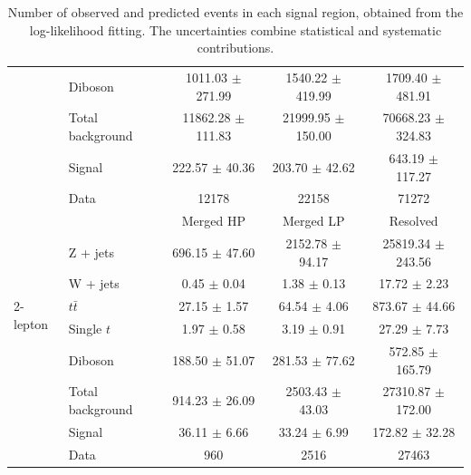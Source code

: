 \begin{table}[htbp]
\begin{center}
\begin{tabular}{| l | l | c | c | c |}
                   & Diboson      &  1011.03 $\pm$ 271.99          &   1540.22 $\pm$ 419.99         & 1709.40 $\pm$ 481.91\\ \cline{2-5}
                   & Total background    & 11862.28 $\pm$ 111.83            &   21999.95 $\pm$ 150.00         & 70668.23 $\pm$ 324.83\\ \cline{2-5}
                   & Signal       & 222.57 $\pm$ 40.36           & 203.70 $\pm$ 42.62           &643.19 $\pm$ 117.27\\ \cline{2-5}
                   & Data         & 12178           & 22158           &71272\\ \hline \hline
\multirow{7}{*}{2-lepton} &     & Merged HP  & Merged LP               & Resolved  \\ \cline{2-5}
        & Z + jets    &  696.15 $\pm$ 47.60  & 2152.78 $\pm$ 94.17     & 25819.34 $\pm$ 243.56\\ 
        & W + jets    &  0.45 $\pm$ 0.04     & 1.38 $\pm$ 0.13         & 17.72 $\pm$ 2.23\\  
        & $t\bar{t}$  &  27.15 $\pm$ 1.57    & 64.54 $\pm$ 4.06        & 873.67 $\pm$ 44.66\\ 
        & Single $t$        &  1.97 $\pm$ 0.58     & 3.19 $\pm$ 0.91         & 27.29 $\pm$ 7.73\\ 
        & Diboson     &  188.50 $\pm$ 51.07  & 281.53 $\pm$ 77.62      & 572.85 $\pm$ 165.79\\ \cline{2-5}
        & Total background   &  914.23 $\pm$ 26.09  & 2503.43 $\pm$ 43.03  & 27310.87 $\pm$ 172.00\\ \cline{2-5}
        & Signal      &  36.11 $\pm$ 6.66    & 33.24 $\pm$ 6.99        & 172.82 $\pm$ 32.28\\ \cline{2-5}
        & Data        &  960                 & 2516                    & 27463\\ \hline 
\end{tabular}
\caption{\label{tab:postyields} Number of observed and predicted events in each signal region, obtained from the log-likelihood fitting. The uncertainties combine statistical and systematic contributions. }
\end{center}
\end{table}

